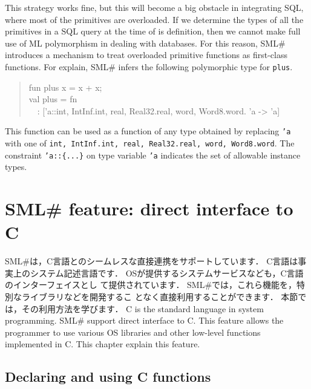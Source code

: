 \documentclass{jbook}
\newcommand{\txt}[2]{#2}
\newcommand{\smlsharp}{SML\#}
\newcommand{\myem}{\mbox{\ \ }}
\begin{document}
	This strategy works fine, but this will become a big obstacle in
integrating SQL, where most of the primitives are overloaded.
	If we determine the types of all the primitives in a SQL query
at the time of is definition, then we cannot make full use of ML
polymorphism in dealing with databases.
	For this reason, \smlsharp{} introduces a mechanism to treat
overloaded primitive functions as first-class functions.
	For explain, \smlsharp{} infers the following polymorphic type
for {\tt plus}.
\begin{tt}
\begin{quote}
fun plus x = x + x;\\
val plus = fn\\
\myem  : ['a::{int, IntInf.int, real, Real32.real, word, Word8.word}. 'a -> 'a]
\end{quote}
\end{tt}
	This function can be used as a function of any type obtained by
replacing {\tt 'a} with one of {\tt int, IntInf.int, real,
Real32.real, word, Word8.word}.
	The constraint {\tt 'a::\{...\}} on type variable {\tt 'a}
indicates the set of allowable instance types.
\fi%


\chapter{
\txt{\smlsharp{}の拡張機能：Cとの直接連携}
    {\smlsharp{} feature: direct interface to C}
}
\label{chap:tutorialCFFI}

\ifjp%
	\smlsharp{}は，C言語とのシームレスな直接連携をサポートしています．
	C言語は事実上のシステム記述言語です．
	OSが提供するシステムサービスなども，C言語のインターフェイスとし
て提供されています．
	\smlsharp{}では，これら機能を，特別なライブラリなどを開発するこ
となく直接利用することができます．
	本節では，その利用方法を学びます．
\else%
	C is the standard language in system programming.
	\smlsharp{} support direct interface to C.
	This feature allows the programmer to use various OS libraries
and other low-level functions implemented in C.
	This chapter explain this feature.
\fi%

\section{\txt{C関数の使用の宣言}{Declaring and using C functions}}
\label{sec:extensionCdecl}
\end{document}
